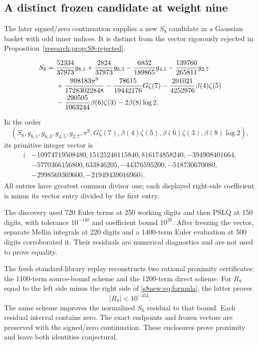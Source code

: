 \subsection{A distinct frozen candidate at weight nine}
\label{s8new:sec:candidate}
The later signed/zero continuation supplies a new $S_8$ candidate in a
Gaussian basket with odd inner indices. It is distinct from the vector
rigorously rejected in Proposition~\ref{research:prop:S8-rejected}.

\begin{conjecture}\label{s8new:conj:S8}
\begin{align}
 S_8={}&\frac{52334}{37973}g_{8,1}+\frac{2824}{37973}g_{6,3}
       -\frac{6832}{189865}g_{4,5}-\frac{139760}{265811}g_{2,7}\notag\\
 &+\frac{998183\pi^9}{17283022848}
       -\frac{78615}{19442176}G\zeta(7)
       -\frac{201021}{4252976}\beta(4)\zeta(5)\notag\\
 &-\frac{290505}{1063244}\beta(6)\zeta(3)-2\beta(8)\log2.
 \label{s8new:eq:formula}
\end{align}
\end{conjecture}
In the order
\[
 (S_8,g_{8,1},g_{6,3},g_{4,5},g_{2,7},\pi^9,
 G\zeta(7),\beta(4)\zeta(5),\beta(6)\zeta(3),\beta(8)\log2),
\]
its primitive integer vector is
\[
\begin{split}
 (&-10974719508480,15125246115840,816174858240,-394908401664,\\
 &-5770366156800,633846205,-44376595200,-518730670080,\\
 &-2998569369600,-21949439016960).
\end{split}
\]
All entries have greatest common divisor one; each displayed right-side
coefficient is minus its vector entry divided by the first entry.

The discovery used 720 Euler terms at 250 working digits and then PSLQ
at 150 digits, with tolerance $10^{-140}$ and coefficient bound $10^{20}$.
After freezing the vector, separate Mellin integrals at 220 digits and a
1400-term Euler evaluation at 500 digits corroborated it. Their residuals
are numerical diagnostics and are not used to prove equality.

The fresh standard-library replay reconstructs two rational proximity
certificates: the 1100-term source-bound scheme and the 1200-term direct
scheme. For $R_8$ equal to the left side minus the right side of
\eqref{s8new:eq:formula}, the latter proves
\[
 |R_8|<10^{-355}.
\]
The same scheme improves the normalized $S_6$ residual to that bound.
Each residual interval contains zero. The exact endpoints and frozen
vectors are preserved with the signed/zero continuation. These enclosures
prove proximity and leave both identities conjectural.
